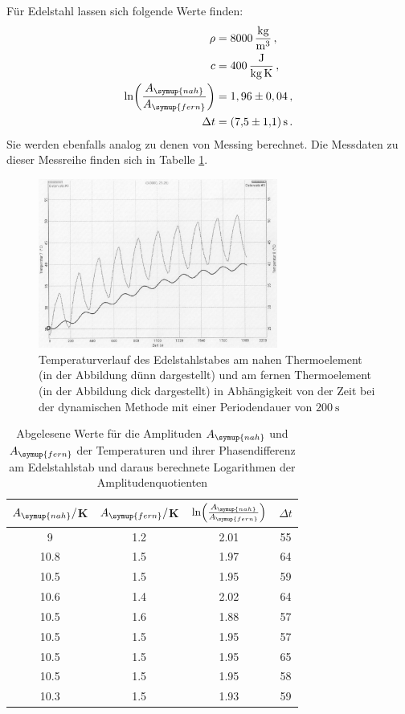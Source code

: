 Für Edelstahl lassen sich folgende Werte finden:
\begin{align}
  \rho &= \SI{8000}{\kilo\gram\per\cubic\meter}\,, \nonumber\\
  c &= \SI{400}{\joule\per\kilo\gram\per\kelvin}\,, \nonumber\\
  \ln\biggl(\frac{A_{\symup{nah}}}{A_{\symup{fern}}}\biggr) &= 1,96\pm 0,04 \,, \nonumber\\
  \Delta t &= \SI{7.5(11)}{\second} \,.\nonumber
\end{align}
Sie werden ebenfalls analog zu denen von Messing berechnet. Die Messdaten zu dieser Messreihe
finden sich in Tabelle \ref{tab:edelstahl_welle}.

\begin{figure}
  \centering
  \includegraphics[width=0.7\textwidth]{data/t7undt8_welle.JPEG}
  \caption{Temperaturverlauf des Edelstahlstabes am nahen Thermoelement (in der Abbildung dünn dargestellt)
  und am fernen Thermoelement (in der Abbildung dick dargestellt) in Abhängigkeit von der Zeit bei der
  dynamischen Methode mit einer Periodendauer von $\SI{200}{\second}$}
  \label{fig:edelstahl_welle}
\end{figure}

\begin{table}
  \centering
  \caption{Abgelesene Werte für die Amplituden $A_{\symup{nah}}$ und $A_{\symup{fern}}$ der Temperaturen und
  ihrer Phasendifferenz am Edelstahlstab und daraus berechnete Logarithmen der Amplitudenquotienten}
  \label{tab:edelstahl_welle}
  \begin{tabular}{c c c c}
    \toprule
     $A_{\symup{nah}}/$K  & $A_{\symup{fern}}/$K & $\ln\Bigl(\frac{A_{\symup{nah}}}{A_{\symup{fern}}}\Bigr)$ & $\Delta t$ \\
    \midrule
    9	    & 1.2 &	2.01  & 55 \\
    10.8	& 1.5 & 1.97	& 64  \\
    10.5  &	1.5	& 1.95  & 59  \\
    10.6	& 1.4	& 2.02  & 64 \\
    10.5	& 1.6	& 1.88  & 57 \\
    10.5	& 1.5	& 1.95  & 57 \\
    10.5	& 1.5	& 1.95  & 65 \\
    10.5	& 1.5	& 1.95  & 58 \\
    10.3  &	1.5	& 1.93  & 59  \\
    \bottomrule
  \end{tabular}
\end{table}

